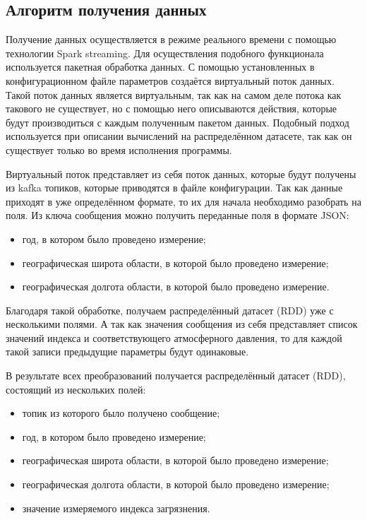 \subsection{Алгоритм получения данных}

Получение данных осуществляется в режиме реального времени с помощью технологии Spark streaming.
Для осуществления подобного функционала используется пакетная обработка данных.
С помощью установленных в конфигурационном файле параметров создаётся виртуальный поток данных.
Такой поток данных является виртуальным, так как на самом деле потока как такового не существует, но с помощью него описываются действия, которые будут производиться с каждым полученным пакетом данных.
Подобный подход используется при описании вычислений на распределённом датасете, так как он существует только во время исполнения программы.

Виртуальный поток представляет из себя поток данных, которые будут получены из kafka топиков, которые приводятся в файле конфигурации.
Так как данные приходят в уже определённом формате, то их для начала необходимо разобрать на поля.
Из ключа сообщения можно получить переданные поля в формате JSON:
\begin{itemize}
    \item год, в котором было проведено измерение;
    \item географическая широта области, в которой было проведено измерение;
    \item географическая долгота области, в которой было проведено измерение.
\end{itemize}

Благодаря такой обработке, получаем распределённый датасет (RDD) уже с несколькими полями.
А так как значения сообщения из себя представляет список значений индекса и соответствующего атмосферного давления, то для каждой такой записи предыдущие параметры будут одинаковые.

В результате всех преобразований получается распределённый датасет (RDD), состоящий из нескольких полей:
\begin{itemize}
    \item топик из которого было получено сообщение;
    \item год, в котором было проведено измерение;
    \item географическая широта области, в которой было проведено измерение;
    \item географическая долгота области, в которой было проведено измерение;
    \item значение измеряемого индекса загрязнения.
\end{itemize}

